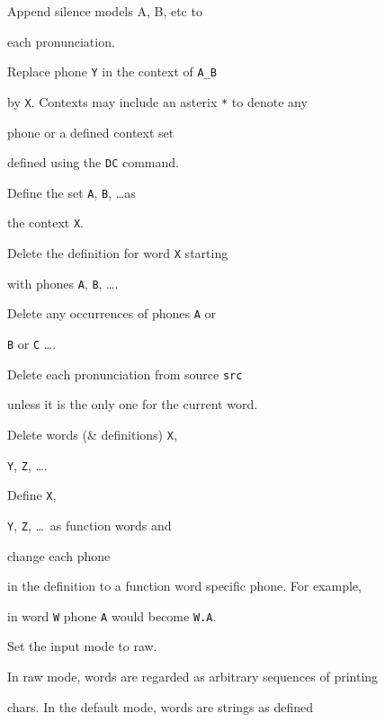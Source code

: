 \begin{varlist}


     Append silence models A, B, etc to 


      each pronunciation.


    Replace phone \texttt{Y} in the context of \texttt{A\_B} 


             by \texttt{X}.  Contexts may include an asterix \texttt{*} to denote any 


             phone or a defined context set 


            defined using the \texttt{DC} command.


    Define the set \texttt{A}, \texttt{B}, \ldots as 


             the context \texttt{X}.


    Delete the definition for word \texttt{X} starting 


                              with phones \texttt{A}, \texttt{B}, \ldots.


    Delete any occurrences of phones \texttt{A} or 


               \texttt{B} or \texttt{C} \ldots.


            Delete each pronunciation from source \texttt{src} 


           unless it is the only one for the current word.


    Delete words (\& definitions) \texttt{X},


           \texttt{Y}, \texttt{Z}, \ldots.


    Define  \texttt{X},


           \texttt{Y}, \texttt{Z}, \ldots\ as function words and 


            change each phone 


           in the definition to a function word specific phone. For example,


           in word \texttt{W} phone \texttt{A} would become \texttt{W.A}.


     Set the input mode to raw.


          In raw mode, words are regarded as arbitrary sequences of printing


          chars.  In the default mode, words are strings as defined 



\end{varlist}
